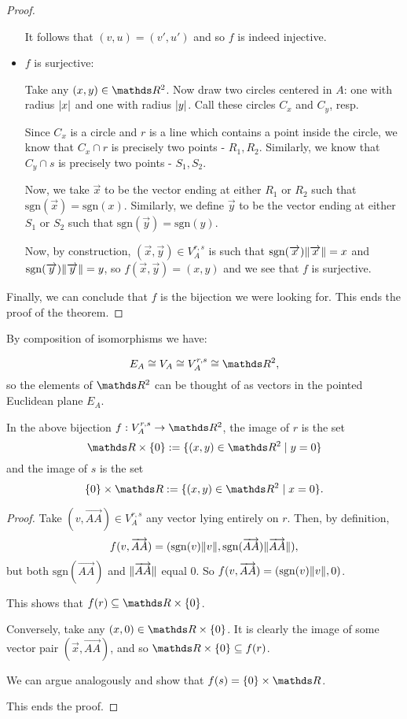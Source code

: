 \begin{proof}
\begin{itemize}
		It follows that $(v,u)=(v',u')$ and so $f$ is indeed injective.
		
		\item $f$ is surjective:
		
		Take any $(x,y)\in \R^2$. Now draw two circles centered in $A$: one with radius $\left\vert x\right\vert$ and one with radius $\left\vert y\right\vert$. Call these circles $C_x$ and $C_y$, resp.
		
		Since $C_x$ is a circle and $r$ is a line which contains a point inside the circle, we know that $C_x\cap r$ is precisely two points - $R_1,R_2$. Similarly, we know that $C_y\cap s$ is precisely two points - $S_1,S_2$.
		
		Now, we take $\overrightarrow{x}$ to be the vector ending at either $R_1$ or $R_2$ such that $\mathrm{sgn}(\overrightarrow{x})=\mathrm{sgn}(x)$. Similarly, we define $\overrightarrow{y}$ to be the vector ending at either $S_1$ or $S_2$ such that $\mathrm{sgn}(\overrightarrow{y})=\mathrm{sgn}(y)$.
		
		Now, by construction, $(\overrightarrow{x},\overrightarrow{y})\in V^{r,s}_A$ is such that $\mathrm{sgn}(\overrightarrow{x})\lVert\overrightarrow{x}\rVert=x$ and $\mathrm{sgn}(\overrightarrow{y})\lVert\overrightarrow{y}\rVert=y$, so $f(\overrightarrow{x},\overrightarrow{y})=(x,y)$ and we see that $f$ is surjective.
	\end{itemize}

Finally, we can conclude that $f$ is the bijection we were looking for. This ends the proof of the theorem.
\end{proof}
\begin{cor}
	By composition of isomorphisms we have:
	
	\[E_A\iso V_A\iso V^{r,s}_A\iso\R^2,\]so the elements of $\R^2$ can be thought of as vectors in the pointed Euclidean plane $E_A$.
\end{cor}

\begin{lemma}
	In the above bijection $f:V^{r,s}_A\to\R^2$, the image of $r$ is the set
	\[\R\times\{0\}:=\{(x,y)\in \R^2\mid y=0\}\]and the image of $s$ is the set
	\[\{0\}\times \R:=\{(x,y)\in\R^2\mid x=0\}.\]
\end{lemma}
\begin{proof}
	Take $(v,\overrightarrow{AA})\in V^{r,s}_A$ any vector lying entirely on $r$. Then, by definition,
	\[f(v,\overrightarrow{AA})=(\mathrm{sgn}(v)\lVert v\rVert,\mathrm{sgn}(\overrightarrow{AA})\lVert\overrightarrow{AA}\rVert),\]but both $\mathrm{sgn}(\overrightarrow{AA})$ and $\lVert\overrightarrow{AA}\rVert$ equal 0. So $f(v,\overrightarrow{AA})=(\mathrm{sgn}(v)\lVert v\rVert,0)$.
	
	This shows that $f(r)\subseteq \R\times\{0\}$.
	
	Conversely, take any $(x,0)\in \R\times\{0\}$. It is clearly the image of some vector pair $(\overrightarrow{x},\overrightarrow{AA})$, and so $\R\times\{0\}\subseteq f(r)$.
	
	We can argue analogously and show that $f(s)=\{0\}\times\R$.
	
	This ends the proof.
\end{proof}

